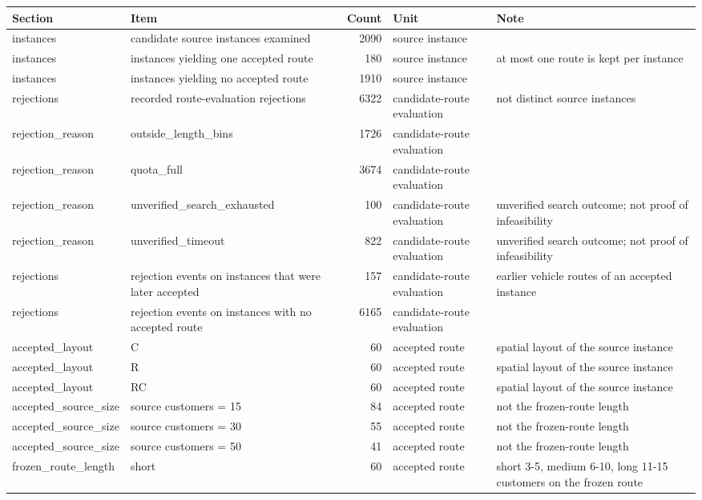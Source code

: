 \begin{tabular}{llrll}
\hline
Section & Item & Count & Unit & Note \\
\hline
instances & candidate source instances examined & 2090 & source instance &  \\
instances & instances yielding one accepted route & 180 & source instance & at most one route is kept per instance \\
instances & instances yielding no accepted route & 1910 & source instance &  \\
rejections & recorded route-evaluation rejections & 6322 & candidate-route evaluation & not distinct source instances \\
rejection\_reason & outside\_length\_bins & 1726 & candidate-route evaluation &  \\
rejection\_reason & quota\_full & 3674 & candidate-route evaluation &  \\
rejection\_reason & unverified\_search\_exhausted & 100 & candidate-route evaluation & unverified search outcome; not proof of infeasibility \\
rejection\_reason & unverified\_timeout & 822 & candidate-route evaluation & unverified search outcome; not proof of infeasibility \\
rejections & rejection events on instances that were later accepted & 157 & candidate-route evaluation & earlier vehicle routes of an accepted instance \\
rejections & rejection events on instances with no accepted route & 6165 & candidate-route evaluation &  \\
accepted\_layout & C & 60 & accepted route & spatial layout of the source instance \\
accepted\_layout & R & 60 & accepted route & spatial layout of the source instance \\
accepted\_layout & RC & 60 & accepted route & spatial layout of the source instance \\
accepted\_source\_size & source customers = 15 & 84 & accepted route & not the frozen-route length \\
accepted\_source\_size & source customers = 30 & 55 & accepted route & not the frozen-route length \\
accepted\_source\_size & source customers = 50 & 41 & accepted route & not the frozen-route length \\
frozen\_route\_length & short & 60 & accepted route & short 3-5, medium 6-10, long 11-15 customers on the frozen route \\

\end{tabular}
